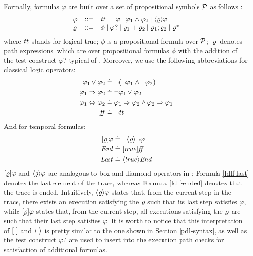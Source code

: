 Formally, \LDLf formulas $\varphi$ are built over a set of propositional symbols $\mathcal{P}$ as follows \citep{Brafman2017SpecifyingNR}:
\[\begin{array}{lcl}
\varphi &::=& {\mathit{tt}}  \mid \lnot \varphi \mid \varphi_1 \land \varphi_2 \mid \langle \varrho \rangle\varphi \\
\varrho &::=& \phi \mid \varphi? \mid  \varrho_1 + \varrho_2 \mid \varrho_1; \varrho_2 \mid \varrho^*
\end{array}
\]
where ${\mathit{tt}}$ stands for logical true; $\phi$ is a propositional
formula over $\mathcal{P}$; $\varrho$ denotes path expressions, which are \REGEX over
propositional formulas $\phi$ with the addition of the test construct
$\varphi?$ typical of \PDL. Moreover, we use the following abbreviations for classical logic operators:
\begin{align*}
\varphi_1\lor\varphi_2 &\doteq \lnot(\lnot \varphi_1\land \lnot
\varphi_2)\\
\varphi_1 \Rightarrow \varphi_2 &\doteq \lnot \varphi_1 \vee \varphi_2\\
\varphi_1 \Leftrightarrow \varphi_2 &\doteq \varphi_1 \Rightarrow \varphi_2 \wedge \varphi_2 \Rightarrow \varphi_1\\
\mathit{ff} &\doteq \lnot {\mathit{tt}}\\
\end{align*}
And for temporal formulas:
\begin{align}
[\varrho]\varphi &\doteq \lnot\langle \varrho \rangle\lnot\varphi \label{ldlf-box}\\
\mathit{End} &\doteq [\mathit{true}]\mathit{ff} \label{ldlf-ended}\\
\mathit{Last} &\doteq \langle \mathit{true} \rangle\mathit{End} \label{ldlf-last}
\end{align}
$[\varrho]\varphi$ and $\langle \varrho \rangle\varphi$ are analogous to box and diamond operators in \PDL; Formula \ref{ldlf-last} denotes the last element of the trace, whereas Formula \ref{ldlf-ended} denotes that the trace is ended.
Intuitively, $\langle \varrho \rangle\varphi$ states that, from the current step
in the trace, there exists an execution satisfying the \REGEX $\varrho$ 
such that its last step satisfies $\varphi$, while
$[\varrho]\varphi$ states that, from the current step, all executions
satisfying the \REGEX $\varrho$ are such that their last step
satisfies $\varphi$.
It is worth to notice that this interpretation of $[\ ]$ and $\langle \  \rangle$ is pretty similar to the one shown in Section \ref{pdl-syntax}, as well as the test construct $\varphi?$ are used to insert into the execution path checks for satisfaction of additional \LDLf formulas.
